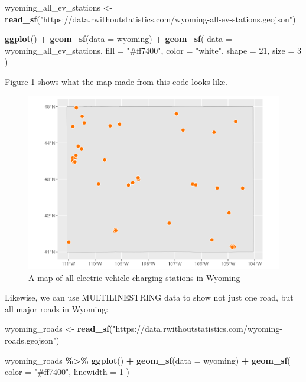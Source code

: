 \documentclass[
]{book}
\newenvironment{Shaded}{\begin{snugshade}}{\end{snugshade}}
\newcommand{\AttributeTok}[1]{\textcolor[rgb]{0.13,0.29,0.53}{#1}}
\newcommand{\DecValTok}[1]{\textcolor[rgb]{0.00,0.00,0.81}{#1}}
\newcommand{\FunctionTok}[1]{\textcolor[rgb]{0.13,0.29,0.53}{\textbf{#1}}}
\newcommand{\NormalTok}[1]{#1}
\newcommand{\OtherTok}[1]{\textcolor[rgb]{0.56,0.35,0.01}{#1}}
\newcommand{\SpecialCharTok}[1]{\textcolor[rgb]{0.81,0.36,0.00}{\textbf{#1}}}
\newcommand{\StringTok}[1]{\textcolor[rgb]{0.31,0.60,0.02}{#1}}
\begin{document}
\begin{Shaded}
\begin{Highlighting}[]
\NormalTok{wyoming\_all\_ev\_stations }\OtherTok{\textless{}{-}} \FunctionTok{read\_sf}\NormalTok{(}\StringTok{"https://data.rwithoutstatistics.com/wyoming{-}all{-}ev{-}stations.geojson"}\NormalTok{)}

\FunctionTok{ggplot}\NormalTok{() }\SpecialCharTok{+}
  \FunctionTok{geom\_sf}\NormalTok{(}\AttributeTok{data =}\NormalTok{ wyoming) }\SpecialCharTok{+}
  \FunctionTok{geom\_sf}\NormalTok{(}
    \AttributeTok{data =}\NormalTok{ wyoming\_all\_ev\_stations,}
    \AttributeTok{fill =} \StringTok{"\#ff7400"}\NormalTok{,}
    \AttributeTok{color =} \StringTok{"white"}\NormalTok{,}
    \AttributeTok{shape =} \DecValTok{21}\NormalTok{,}
    \AttributeTok{size =} \DecValTok{3}
\NormalTok{  )}
\end{Highlighting}
\end{Shaded}

Figure \ref{fig:wyoming-ev-stations-map} shows what the map made from this code looks like.

\begin{figure}
\includegraphics[width=1\linewidth]{maps_files/figure-latex/wyoming-ev-stations-map-1} \caption{A map of all electric vehicle charging stations in Wyoming}\label{fig:wyoming-ev-stations-map}
\end{figure}

Likewise, we can use MULTILINESTRING data to show not just one road, but all major roads in Wyoming:

\begin{Shaded}
\begin{Highlighting}[]
\NormalTok{wyoming\_roads }\OtherTok{\textless{}{-}} \FunctionTok{read\_sf}\NormalTok{(}\StringTok{"https://data.rwithoutstatistics.com/wyoming{-}roads.geojson"}\NormalTok{)}

\NormalTok{wyoming\_roads }\SpecialCharTok{\%\textgreater{}\%}
  \FunctionTok{ggplot}\NormalTok{() }\SpecialCharTok{+}
  \FunctionTok{geom\_sf}\NormalTok{(}\AttributeTok{data =}\NormalTok{ wyoming) }\SpecialCharTok{+}
  \FunctionTok{geom\_sf}\NormalTok{(}
    \AttributeTok{color =} \StringTok{"\#ff7400"}\NormalTok{,}
    \AttributeTok{linewidth =} \DecValTok{1}
\NormalTok{  )}
\end{Highlighting}
\end{Shaded}
\end{document}
